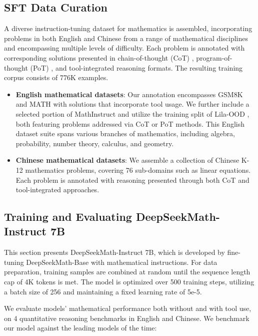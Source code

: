 \begin{itemize}[topsep=0pt]
\subsection{SFT Data Curation}

A diverse instruction-tuning dataset for mathematics is assembled, incorporating problems in both English and Chinese from a range of mathematical disciplines and encompassing multiple levels of difficulty. Each problem is annotated with corresponding solutions presented in chain-of-thought (CoT) \citep{cot}, program-of-thought (PoT) \citep{pot,pal}, and tool-integrated reasoning \citep{tora} formats. The resulting training corpus consists of 776K examples.

\begin{itemize}[topsep=0pt]
    \item \textbf{English mathematical datasets}: Our annotation encompasses GSM8K and MATH with solutions that incorporate tool usage. We further include a selected portion of MathInstruct \citep{MathInstruct} and utilize the training split of Lila-OOD \citep{lila}, both featuring problems addressed via CoT or PoT methods. This English dataset suite spans various branches of mathematics, including algebra, probability, number theory, calculus, and geometry.
    \item \textbf{Chinese mathematical datasets}: We assemble a collection of Chinese K-12 mathematics problems, covering 76 sub-domains such as linear equations. Each problem is annotated with reasoning presented through both CoT and tool-integrated approaches.
\end{itemize}

\subsection{Training and Evaluating DeepSeekMath-Instruct 7B}

This section presents DeepSeekMath-Instruct 7B, which is developed by fine-tuning DeepSeekMath-Base with mathematical instructions. For data preparation, training samples are combined at random until the sequence length cap of 4K tokens is met. The model is optimized over 500 training steps, utilizing a batch size of 256 and maintaining a fixed learning rate of 5e-5.

We evaluate models' mathematical performance both without and with tool use, on 4 quantitative reasoning benchmarks in English and Chinese. We benchmark our model against the leading models of the time:


\end{itemize}
